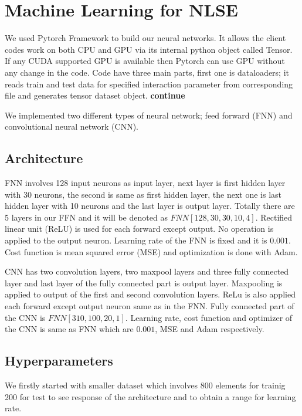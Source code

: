 \documentclass[a4paper,times,12pt]{article}
\begin{document}
\section{Machine Learning for NLSE}

We used Pytorch Framework to build our neural networks. It allows the client codes work on both CPU and GPU via its internal python object called Tensor. If any CUDA supported GPU is available then Pytorch can use GPU without any change in the code. Code have three main parts, first one is dataloaders; it reads train and test data for specified interaction parameter from corresponding file and generates tensor dataset object. \textbf{continue}

We implemented two different types of neural network; feed forward (FNN) and convolutional neural network (CNN).


\subsection{Architecture}

FNN involves 128 input neurons as input layer, next layer is first hidden layer with 30 neurons, the second is same as first hidden layer, the next one is last hidden layer with 10 neurons and the last layer is output layer. Totally there are 5 layers in our FFN and it will be denoted as $FNN[128, 30, 30, 10, 4]$. Rectified linear unit (ReLU) is used for each forward except output. No operation is applied to the output neuron. Learning rate of the FNN is fixed and it is $0.001$. Cost function is mean squared error (MSE) and optimization is done with Adam. 


CNN has two convolution layers, two maxpool layers and three fully connected layer and last layer of the fully connected part is output layer. Maxpooling is applied to output of the first and second convolution layers. ReLu is also applied each forward except output neuron same as in the FNN. Fully connected part of the CNN is $FNN[310, 100, 20, 1]$. Learning rate, cost function and optimizer of the CNN is same as FNN which are $0.001$, MSE and Adam respectively.


\subsection{Hyperparameters}

We firstly started with smaller dataset which involves 800 elements for trainig 200 for test to see response of the architecture and to obtain a range for learning rate.
\end{document}
